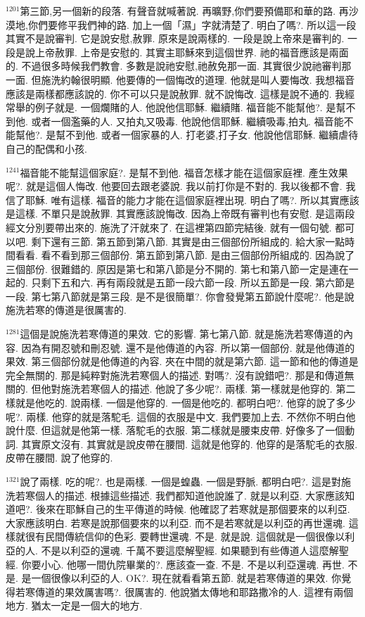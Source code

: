 \documentclass{book}
\begin{document}
$^{1201}$第三節,另一個新的段落.
有聲音就喊著說.
再曠野,你們要預備耶和華的路.
再沙漠地,你們要修平我們神的路.
加上一個「濕」字就清楚了.
明白了嗎?.
所以這一段其實不是說審判.
它是說安慰,赦罪.
原來是說兩樣的.
一段是說上帝來是審判的.
一段是說上帝赦罪.
上帝是安慰的.
其實主耶穌來到這個世界.
祂的福音應該是兩面的.
不過很多時候我們教會.
多數是說祂安慰,祂赦免那一面.
其實很少說祂審判那一面.
但施洗約翰很明顯.
他要傳的一個悔改的道理.
他就是叫人要悔改.
我想福音應該是兩樣都應該說的.
你不可以只是說赦罪.
就不說悔改.
這樣是說不通的.
我經常舉的例子就是.
一個爛賭的人.
他說他信耶穌.
繼續賭.
福音能不能幫他?.
是幫不到他.
或者一個濫藥的人.
又拍丸又吸毒.
他說他信耶穌.
繼續吸毒,拍丸.
福音能不能幫他?.
是幫不到他.
或者一個家暴的人.
打老婆,打子女.
他說他信耶穌.
繼續虐待自己的配偶和小孩.

$^{1241}$福音能不能幫這個家庭?.
是幫不到他.
福音怎樣才能在這個家庭裡.
產生效果呢?.
就是這個人悔改.
他要回去跟老婆說.
我以前打你是不對的.
我以後都不會.
我信了耶穌.
唯有這樣.
福音的能力才能在這個家庭裡出現.
明白了嗎?.
所以其實應該是這樣.
不單只是說赦罪.
其實應該說悔改.
因為上帝既有審判也有安慰.
是這兩段經文分別要帶出來的.
施洗了汗就來了.
在這裡第四節完結後.
就有一個句號.
都可以吧.
剩下還有三節.
第五節到第八節.
其實是由三個部份所組成的.
給大家一點時間看看.
看不看到那三個部份.
第五節到第八節.
是由三個部份所組成的.
因為說了三個部份.
很難錯的.
原因是第七和第八節是分不開的.
第七和第八節一定是連在一起的.
只剩下五和六.
再有兩段就是五節一段六節一段.
所以五節是一段.
第六節是一段.
第七第八節就是第三段.
是不是很簡單?.
你會發覺第五節說什麼呢?.
他是說施洗若寒的傳道是很厲害的.

$^{1281}$這個是說施洗若寒傳道的果效.
它的影響.
第七第八節.
就是施洗若寒傳道的內容.
因為有開忍號和刪忍號.
還不是他傳道的內容.
所以第一個部份.
就是他傳道的果效.
第三個部份就是他傳道的內容.
夾在中間的就是第六節.
這一節和他的傳道是完全無關的.
那是純粹對施洗若寒個人的描述.
對嗎?.
沒有說錯吧?.
那是和傳道無關的.
但他對施洗若寒個人的描述.
他說了多少呢?.
兩樣.
第一樣就是他穿的.
第二樣就是他吃的.
說兩樣.
一個是他穿的.
一個是他吃的.
都明白吧?.
他穿的說了多少呢?.
兩樣.
他穿的就是落駝毛.
這個的衣服是中文.
我們要加上去.
不然你不明白他說什麼.
但這就是他第一樣.
落駝毛的衣服.
第二樣就是腰束皮帶.
好像多了一個動詞.
其實原文沒有.
其實就是說皮帶在腰間.
這就是他穿的.
他穿的是落駝毛的衣服.
皮帶在腰間.
說了他穿的.

$^{1321}$說了兩樣.
吃的呢?.
也是兩樣.
一個是蝗蟲.
一個是野脈.
都明白吧?.
這是對施洗若寒個人的描述.
根據這些描述.
我們都知道他說誰了.
就是以利亞.
大家應該知道吧?.
後來在耶穌自己的生平傳道的時候.
他確認了若寒就是那個要來的以利亞.
大家應該明白.
若寒是說那個要來的以利亞.
而不是若寒就是以利亞的再世還魂.
這樣就很有民間傳統信仰的色彩.
要轉世還魂.
不是.
就是說.
這個就是一個很像以利亞的人.
不是以利亞的還魂.
千萬不要這麼解聖經.
如果聽到有些傳道人這麼解聖經.
你要小心.
他哪一間仇院畢業的?.
應該查一查.
不是.
不是以利亞還魂.
再世.
不是.
是一個很像以利亞的人.
OK?.
現在就看看第五節.
就是若寒傳道的果效.
你覺得若寒傳道的果效厲害嗎?.
很厲害的.
他說猶太傳地和耶路撒冷的人.
這裡有兩個地方.
猶太一定是一個大的地方.
\end{document}
